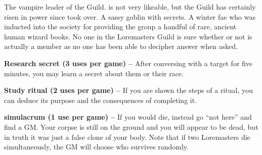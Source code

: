 \documentclass[blue]{guildcamp2}
\begin{document}
\begin{members}
  \member{\cVampire{}} The vampire leader of the Guild. \cVampire{\They} is not very likeable, but the Guild has certainly risen in power since \cVampire{\they} took over.
	\member{\cGoblin{}} A sassy goblin with secrets. 
	\member{\cBabyFae{}} A winter fae who was inducted into the society for providing the group a handful of rare, ancient human wizard books.
	\member{\cSphinx{}} No one in the Loremasters Guild is sure whether or not \cSphinx{} is actually a member as no one has been able to decipher \cSphinx{\their} answer when asked.
	
\end{members}


\begin{itemz}
	\item \textbf{Research secret (3 uses per game) --} After conversing with a target for five minutes, you may learn a secret about them or their race.
	\item \textbf{Study ritual (2 uses per game) --} If you are shown the steps of a ritual, you can deduce its purpose and the consequences of completing it.
	\item \textbf{simulacrum (1 use per game) --} If you would die, instead go ``not here'' and find a GM.  Your corpse is still on the ground and you will appear to be dead, but in truth it was just a false clone of your body. Note that if two Loremasters die simultaneously, the GM will choose who survives randomly.
\end{itemz}
	
\end{document}
